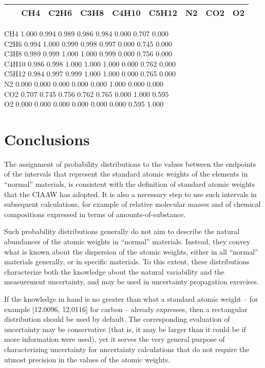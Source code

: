\documentclass[a5paper,openany]{book}
\begin{document}
\begin{tabular}{ccccccccc}
	~ & CH4 & C2H6 & C3H8 & C4H10 & C5H12 & N2 & CO2 & O2 \\
	\hline
\end{tabular}

CH4 1.000 0.994 0.989 0.986 0.984 0.000 0.707 0.000 \\
C2H6 0.994 1.000 0.999 0.998 0.997 0.000 0.745 0.000\\
C3H8 0.989 0.999 1.000 1.000 0.999 0.000 0.756 0.000\\
C4H10 0.986 0.998 1.000 1.000 1.000 0.000 0.762 0.000\\
C5H12 0.984 0.997 0.999 1.000 1.000 0.000 0.765 0.000\\
N2 0.000 0.000 0.000 0.000 0.000 1.000 0.000 0.000\\
CO2 0.707 0.745 0.756 0.762 0.765 0.000 1.000 0.595\\
O2 0.000 0.000 0.000 0.000 0.000 0.000 0.595 1.000\\

\section{Conclusions}

The assignment of probability distributions to the values between the endpoints of the intervals that represent
the standard atomic weights of the elements in “normal” materials, is consistent with the definition
of standard atomic weights that the CIAAW has adopted. It is also a necessary step to use such intervals in
subsequent calculations, for example of relative molecular masses and of chemical compositions expressed
in terms of amounts-of-substance.

Such probability distributions generally do not aim to describe the natural abundances of the atomic
weights in “normal” materials. Instead, they convey what is known about the dispersion of the atomic
weights, either in all “normal” materials generally, or in specific materials. To this extent, these distributions
characterize both the knowledge about the natural variability and the measurement uncertainty, and may be
used in uncertainty propagation exercises.

If the knowledge in hand is no greater than what a standard atomic weight – for example [12.0096,
12.0116] for carbon – already expresses, then a rectangular distribution should be used by default. The corresponding
evaluation of uncertainty may be conservative (that is, it may be larger than it could be if more
information were used), yet it serves the very general purpose of characterizing uncertainty for uncertainty
calculations that do not require the utmost precision in the values of the atomic weights.
\end{document}
